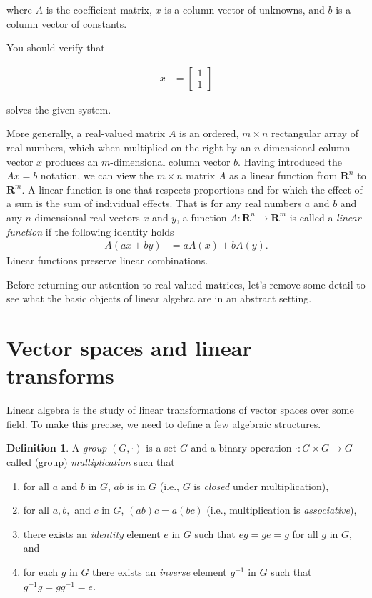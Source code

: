 \documentclass[]{article}
\theoremstyle{plain}
\theoremstyle{definition}
\newtheorem{defn}{Definition}
\theoremstyle{remark}
\newcommand{\reals}{\mathbf{R}}
\begin{document}
where $A$ is the coefficient matrix, $x$ is a column vector of
unknowns, and $b$ is a column vector of constants.

You should verify that

\begin{align*}
x &= \begin{bmatrix}1 \\ 1\end{bmatrix}
\end{align*}

solves the given system.

More generally, a real-valued matrix $A$ is an ordered, $m \times n$ rectangular
array of real numbers, which when multiplied on the right by an $n$-dimensional
column vector $x$ produces an $m$-dimensional column vector
$b$.  Having introduced the $Ax = b$ notation, we
can view the $m \times n$ matrix $A$ as a linear function from $\reals^n$ to
$\reals^m$.  A linear function is one that respects proportions and for which
the effect of a sum is the sum of individual effects.  That is for any real
numbers $a$ and $b$ and any $n$-dimensional real vectors $x$ and
$y$, a function $A : \reals^n \to \reals^m$ is called a \emph{linear
function} if the following identity holds
\begin{align*}
A(ax + by) &= aA(x) + bA(y).
\end{align*}
Linear functions preserve linear combinations. 

Before returning our attention to real-valued matrices, let's remove some
detail to see what the basic objects of linear algebra are in an abstract
setting.

\section{Vector spaces and linear transforms}\label{vector-spaces-and-linear-transforms}

Linear algebra is the study of linear transformations of vector spaces over
some field.  To make this precise, we need to define a few algebraic
structures.

\begin{defn}
A \emph{group} $(G, \cdot)$ is a set $G$ and a binary operation $\cdot: G \times G \to G$
called (group) \emph{multiplication} such that
\begin{enumerate}
\item for all $a$ and $b$ in $G$, $ab$ is in $G$ (i.e., $G$ is \emph{closed} under multiplication),
\item for all $a, b,$ and $c$ in $G$, $(ab)c = a(bc)$ (i.e., multiplication is \emph{associative}),
\item there exists an \emph{identity} element $e$ in $G$ such that $eg = ge = g$ for all $g$ in $G$, and
\item for each $g$ in $G$ there exists an \emph{inverse} element $g^{-1}$ in $G$ such that $g^{-1}g = gg^{-1} = e$.
\end{enumerate}
\end{defn}
\end{document}
